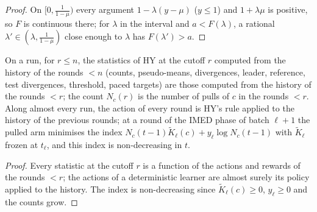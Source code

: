 \documentclass[11pt]{article}
\begin{document}
\begin{proof}
On $[0,\frac1{1-\mu})$ every argument $1-\lambda(y-\mu)$ ($y\le1$) and $1+\lambda\mu$ is positive,
so $F$ is continuous there; for $\lambda$ in the interval and $a<F(\lambda)$, a rational
$\lambda'\in(\lambda,\frac1{1-\mu})$ close enough to $\lambda$ has $F(\lambda')>a$.
\end{proof}

\begin{lemma}\label{flem:frozen}
On a run, for $r\le n$, the statistics of HY at the cutoff $r$ computed from the history of the
rounds $<n$ (counts, pseudo-means, divergences, leader, reference, test divergences, threshold,
paced targets) are those computed from the history of the rounds $<r$; the count $N_c(r)$ is the
number of pulls of $c$ in the rounds $<r$. Along almost every run, the action of every round is
HY's rule applied to the history of the previous rounds; at a round of the IMED phase of batch
$\ell+1$ the pulled arm minimises the index $N_c(t-1)\tilde K_\ell(c)+y_\ell\log N_c(t-1)$ with
$\tilde K_\ell$ frozen at $t_\ell$, and this index is non-decreasing in $t$.
\end{lemma}

\begin{proof}
Every statistic at the cutoff $r$ is a function of the actions and rewards of the rounds $<r$;
the actions of a deterministic learner are almost surely its policy applied to the history. The
index is non-decreasing since $\tilde K_\ell(c)\ge0$, $y_\ell\ge0$ and the counts grow.
\end{proof}
\end{document}
